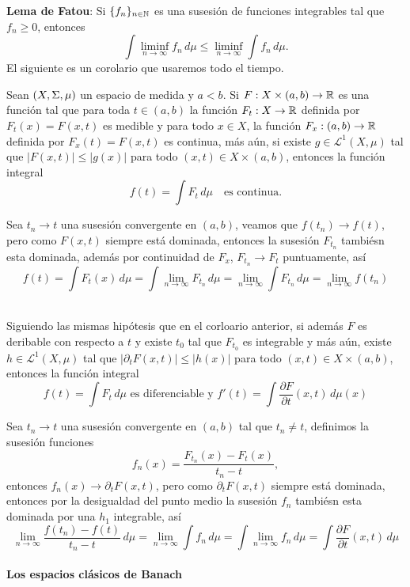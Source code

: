 \documentclass[main.tex]{subfiles}
\begin{document}
\exe\textbf{Lema de Fatou}: Si $\{f_n\}_{n\in \mathbb N }$ es una susesión de funciones integrables tal que $f_n \geq 0$, entonces
\[
\int \liminf_{n \to \infty} f_n \, d\mu \leq \liminf_{n \to \infty} \int f_n \, d\mu.
\]
El siguiente es un corolario que usaremos todo el tiempo.
\begin{cor}
  Sean $(X,\Sigma,\mu)$ un espacio de medida y $a<b$. Si $F:X\times(a,b)\to\mathbb R $ es una función tal que para toda $t\in(a,b)$ la función $F_t:X\to\mathbb R $ definida por $F_t(x)=F(x,t)$ es medible y para todo $x\in X$, la función $F_x:(a,b)\to\mathbb R $ definida por $F_x(t)=F(x,t)$ es continua, más aún, si existe $g\in\mathcal{L}^1(X,\mu)$ tal que $|F(x,t)|\leq|g(x)|$ para todo $(x,t)\in X\times(a,b)$, entonces la función integral
\begin{equation}
  f(t)=\int F_t\,d\mu\quad\text{es continua.}
  \end{equation}
\end{cor}
\dem Sea $t_n\to t$ una susesión convergente en $(a,b)$, veamos que $f(t_n)\to f(t)$, pero como $F(x,t)$ siempre está dominada, entonces la susesión $F_{t_n}$ tambiésn esta dominada, además por continuidad de $F_x$, $F_{t_n}\to F_t$ puntuamente, así
\[
f(t)=\int F_t(x)\,d\mu=\int\lim_{n\to\infty}F_{t_n}\,d\mu=\lim_{n\to\infty}\int F_{t_n}\,d\mu=\lim_{n\to\infty}f(t_n)
\]
\QED\\
\begin{cor}
Siguiendo las mismas hipótesis que en el corloario anterior, si además $F$ es deribable con respecto a $t$ y existe $t_0$ tal que $F_{t_0}$ es integrable y más aún, existe $h\in\mathcal{L}^1(X,\mu)$ tal que $|\partial_t F(x,t)|\leq|h(x)|$ para todo $(x,t)\in X\times(a,b)$, entonces la función integral
\begin{equation}
  f(t)=\int F_t\,d\mu\text{ es diferenciable y } f'(t)=\int \dfrac{\partial F}{\partial t}(x,t)\,d\mu(x)
  \end{equation}
\end{cor}
\dem Sea $t_n\to t$ una susesión convergente en $(a,b)$ tal que $t_n\neq t$, definimos la susesión funciones
\[
f_n(x)=\frac{F_{t_n}(x)-F_t(x)}{t_n-t},
\]
entonces $f_n(x)\to\partial_tF(x,t)$, pero como $\partial_t F(x,t)$ siempre está dominada, entonces por la desigualdad del punto medio la susesión $f_{n}$ tambiésn esta dominada por una $h_1$ integrable, así
\[
\lim_{n\to\infty}\frac{f(t_n)-f(t)}{t_n-t}\,d\mu=\lim_{n\to\infty}\int f_{n}\,d\mu=\int\lim_{n\to\infty}f_{n}\,d\mu=\int \dfrac{\partial F}{\partial t}(x,t)\,d\mu
\]
\QED\\
\noindent\textbf{Los espacios clásicos de Banach}
\end{document}
